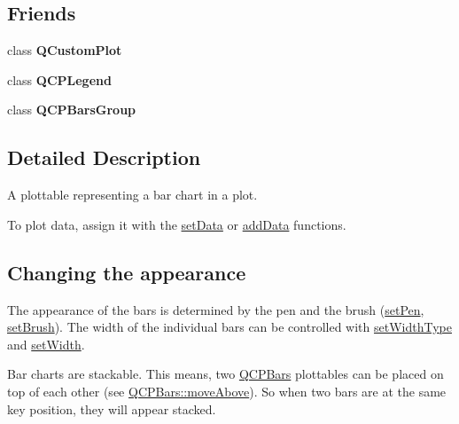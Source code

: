 \subsection*{\-Friends}
\begin{DoxyCompactItemize}
\item 
\hypertarget{classQCPBars_a1cdf9df76adcfae45261690aa0ca2198}{class {\bfseries \-Q\-Custom\-Plot}}\label{classQCPBars_a1cdf9df76adcfae45261690aa0ca2198}

\item 
\hypertarget{classQCPBars_a8429035e7adfbd7f05805a6530ad5e3b}{class {\bfseries \-Q\-C\-P\-Legend}}\label{classQCPBars_a8429035e7adfbd7f05805a6530ad5e3b}

\item 
\hypertarget{classQCPBars_ae1051b4d58a2786cb420367a586e2fee}{class {\bfseries \-Q\-C\-P\-Bars\-Group}}\label{classQCPBars_ae1051b4d58a2786cb420367a586e2fee}

\end{DoxyCompactItemize}


\subsection{\-Detailed \-Description}
\-A plottable representing a bar chart in a plot. 



\-To plot data, assign it with the \hyperlink{classQCPBars_aa3435aab19e0a49e4e7b41bd36a8d96b}{set\-Data} or \hyperlink{classQCPBars_a1f29cf08615040993209147fa68de3f2}{add\-Data} functions.\hypertarget{classQCPStatisticalBox_appearance}{}\subsection{\-Changing the appearance}\label{classQCPStatisticalBox_appearance}
\-The appearance of the bars is determined by the pen and the brush (\hyperlink{classQCPAbstractPlottable_ab74b09ae4c0e7e13142fe4b5bf46cac7}{set\-Pen}, \hyperlink{classQCPAbstractPlottable_a7a4b92144dca6453a1f0f210e27edc74}{set\-Brush}). \-The width of the individual bars can be controlled with \hyperlink{classQCPBars_adcaa3b41281bb2c0f7949b341592fcc0}{set\-Width\-Type} and \hyperlink{classQCPBars_afec6116579d44d5b706e0fa5e5332507}{set\-Width}.

\-Bar charts are stackable. \-This means, two \hyperlink{classQCPBars}{\-Q\-C\-P\-Bars} plottables can be placed on top of each other (see \hyperlink{classQCPBars_ac22e00a6a41509538c21b04f0a57318c}{\-Q\-C\-P\-Bars\-::move\-Above}). \-So when two bars are at the same key position, they will appear stacked.

